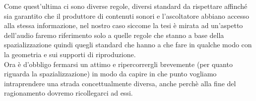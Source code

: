 \documentclass[12pt,a4paper]{report}
\begin{document}
Come quest'ultima ci sono diverse regole, diversi standard da rispettare affinché sia garantito che il produttore di contenuti sonori e l'ascoltatore abbiano accesso alla stessa informazione, nel nostro caso siccome la tesi è mirata ad un'aspetto dell'audio faremo riferimento solo a quelle regole che stanno a base della spazializzazione quindi quegli standard che hanno a che fare in qualche modo con la geometria e sui supporti di riproduzione.\\

Ora è d'obbligo fermarsi un attimo e ripercorrergli brevemente (per quanto riguarda la spazializzazione) in modo da capire in che punto vogliamo intraprendere una strada concettualmente diversa, anche perchè alla fine del ragionamento dovremo ricollegarci ad essi.






\end{document}
